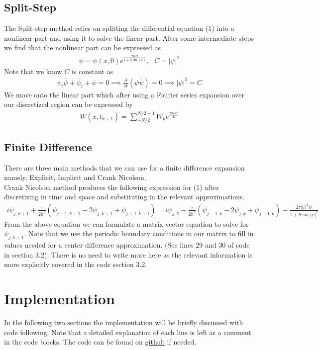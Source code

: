 \documentclass{article}
\begin{document}
\subsection{Split-Step}
The Split-step method relies on splitting the differential equation (1) into a nonlinear part and using it to solve the linear part. After some intermediate steps we find that the nonlinear part can be expressed as
\begin{align}
\psi = \psi(x,0) e^{\frac{2iCt}{1+S\sin(c)}},\text{\ \ \ } C = |\psi|^2
\end{align}
Note that we know $C$ is constant as 
\begin{align}
\psi_t \bar{\psi} + \bar{\psi_t} + \psi = 0 \implies \frac{\partial}{\partial t}(\psi\bar{\psi}) = 0 \implies |\psi|^2 = C
\end{align}
We move onto the linear part which after using a Fourier series expansion over our discretized region can be expressed by
\begin{align}
W(x,t_{k+1}) = \sum_{-N/2}^{N/2-1} W_k e^{\frac{2 \pi i k x}{L}}
\end{align}
\subsection{Finite Difference}
There are three main methods that we can use for a finite difference expansion namely, Explicit, Implicit and Crank Nicolson. \\
Crank Nicolson method produces the following expression for (1) after discretizing in time and space and substituting in the relevant approximations. 
\begin{align}
i\psi_{j,k+1} + \frac{\tau}{2h^2}(\psi_{j-1,k+1} -2\psi_{j,k+1} + \psi_{j+1,k+1}) = i\psi_{j,k} - \frac{\tau}{2h^2}(\psi_{j-1,k}-2\psi_{j,k} + \psi_{j+1,k}) - \frac{2\tau |\psi|^2 \psi}{1+S\sin|\psi|^2}
\end{align}
From the above equation we can formulate a matrix vector equation to solve for $\psi_{j,k+1}$. Note that we use the periodic boundary conditions in our matrix to fill in values needed for a center difference approximation. (See lines 29 and 30 of code in section 3.2). There is no need to write more here as the relevant information is more explicitly covered in the code section 3.2.
\section{Implementation}
In the following two sections the implementation will be briefly discussed with code following. Note that a detailed explanation of each line is left as a comment in the code blocks. The code can be found on \href{https://github.com/Liam-Watson/SolitonColisonsInOpticalFiber}{github} if needed. 
\end{document}
